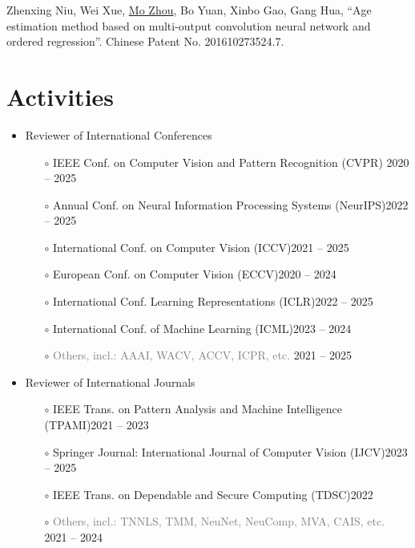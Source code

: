 \documentclass[10pt,margin,line,pifont,palatino,courier]{res}
\begin{document}
\begin{resume}
\begin{enumerate}[noitemsep, leftmargin=*, label={[P0{\arabic*}]}]
\item Zhenxing Niu, Wei Xue, \underline{Mo Zhou}, Bo Yuan, Xinbo Gao, Gang Hua,
    ``Age estimation method based on multi-output convolution neural
    network and ordered regression''. Chinese Patent No. 201610273524.7.

\end{enumerate}

\section{\sc Activities}

\begin{itemize}[leftmargin=*]
\item Reviewer of International Conferences
    \begin{itemize}[noitemsep, leftmargin=*]
        \item[$\circ$] IEEE Conf. on Computer Vision and Pattern Recognition (CVPR) \hfill 2020 -- 2025
        \item[$\circ$] Annual Conf. on Neural Information Processing Systems (NeurIPS)\hfill 2022 -- 2025
        \item[$\circ$] International Conf. on Computer Vision (ICCV)\hfill 2021 -- 2025
        \item[$\circ$] European Conf. on Computer Vision (ECCV)\hfill 2020 -- 2024
        \item[$\circ$] International Conf. Learning Representations (ICLR)\hfill 2022 -- 2025
        \item[$\circ$] International Conf. of Machine Learning (ICML)\hfill 2023 -- 2024
        \item[$\circ$] \textcolor{gray}{Others, incl.: AAAI, WACV, ACCV, ICPR, etc.} \hfill 2021 -- 2025
    \end{itemize}
\item Reviewer of International Journals
    \begin{itemize}[noitemsep, leftmargin=*]
        \item[$\circ$] IEEE Trans. on Pattern Analysis and Machine Intelligence (TPAMI)\hfill 2021 -- 2023
        \item[$\circ$] Springer Journal: International Journal of Computer Vision (IJCV)\hfill 2023 -- 2025
        \item[$\circ$] IEEE Trans. on Dependable and Secure Computing (TDSC)\hfill 2022
        \item[$\circ$] \textcolor{gray}{Others, incl.: TNNLS, TMM, NeuNet, NeuComp, MVA, CAIS, etc.} \hfill 2021 -- 2024

\end{itemize}
\end{itemize}
\end{resume}
\end{document}
